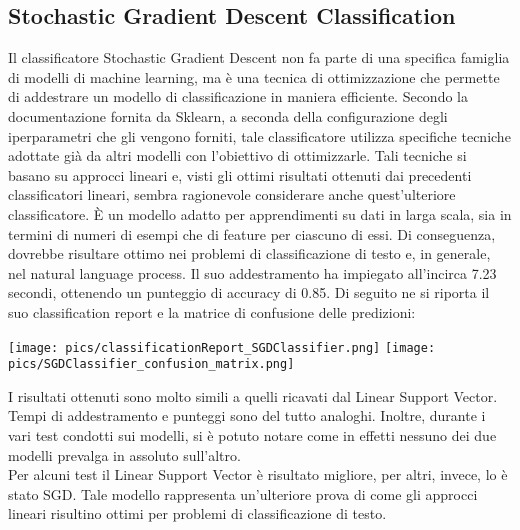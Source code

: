 \documentclass[12pt,oneside]{article}
\begin{document}
   \begin{enumerate}
    \subsection{Stochastic Gradient Descent Classification}
    \begin{justify}
    Il classificatore Stochastic Gradient Descent non fa parte di una specifica famiglia di modelli di machine learning, ma è una tecnica di ottimizzazione che permette di addestrare un modello di classificazione in maniera efficiente. Secondo la documentazione fornita da Sklearn, a seconda della configurazione degli iperparametri che gli vengono forniti, tale classificatore utilizza specifiche tecniche adottate già da altri modelli con l’obiettivo di ottimizzarle. Tali tecniche si basano su approcci lineari e, visti gli ottimi risultati ottenuti dai precedenti classificatori lineari, sembra ragionevole considerare anche quest’ulteriore classificatore. È un modello adatto per apprendimenti su dati in larga scala, sia in termini di numeri di esempi che di feature per ciascuno di essi. Di conseguenza, dovrebbe risultare ottimo nei problemi di classificazione di testo e, in generale, nel natural language process.
    Il suo addestramento ha impiegato all’incirca 7.23 secondi, ottenendo un punteggio di accuracy di 0.85. Di seguito ne si riporta il suo classification report e la matrice di confusione delle predizioni:
    \end{justify}

    \centering
    \texttt{[image: pics/classificationReport\_SGDClassifier.png]}
    \texttt{[image: pics/SGDClassifier\_confusion\_matrix.png]}

    \begin{justify}
    I risultati ottenuti sono molto simili a quelli ricavati dal Linear Support Vector. Tempi di addestramento e punteggi sono del tutto analoghi. Inoltre, durante i vari test condotti sui modelli, si è potuto notare come in effetti nessuno dei due modelli prevalga in assoluto sull’altro.\\
    Per alcuni test il Linear Support Vector è risultato migliore, per altri, invece, lo è stato SGD. Tale modello rappresenta un’ulteriore prova di come gli approcci lineari risultino ottimi per problemi di classificazione di testo.
    \end{justify}
    \end{enumerate}
\end{document}
